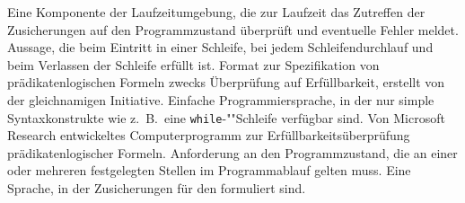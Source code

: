 \begin{description}
     Eine Komponente der Laufzeitumgebung, die zur Laufzeit das Zutreffen der Zusicherungen auf den Programmzustand überprüft und eventuelle Fehler meldet.
     Aussage, die beim Eintritt in einer Schleife, bei jedem Schleifendurchlauf und beim Verlassen der Schleife erfüllt ist.
     Format zur Spezifikation von prädikatenlogischen Formeln zwecks Überprüfung auf Erfüllbarkeit, erstellt von der gleichnamigen Initiative.
     Einfache Programmiersprache, in der nur simple Syntaxkonstrukte wie z.~B.\ eine \texttt{while}-""Schleife verfügbar sind.
     Von Microsoft Research entwickeltes Computerprogramm zur Erfüllbarkeitsüberprüfung prädikatenlogischer Formeln.
     Anforderung an den Programmzustand, die an einer oder mehreren festgelegten Stellen im Programmablauf gelten muss.
     Eine Sprache, in der Zusicherungen für den  formuliert sind.
\end{description}

